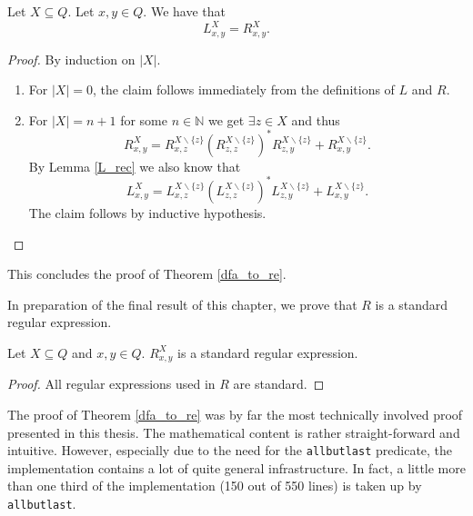 \begin{lemma}
    \label{L_R}
    Let $X \subseteq Q$. Let $x,y \in Q$. We have that 
    \begin{equation*}
        L^X_{x,y} = R^X_{x,y}.
    \end{equation*}
\end{lemma}
\begin{proof}
    By induction on $|X|$.
    \begin{enumerate}
        \item For $|X| = 0$, the claim follows immediately from the definitions of $L$ and $R$. 
        \item For $|X| = n+1$ for some $n \in \mathbb{N}$ we get $\exists z \in X$ and thus 
            \begin{equation*}
                R^X_{x,y} = R^{X\backslash\{z\}}_{x,z} (R^{X\backslash\{z\}}_{z,z})^* R^{X\backslash\{z\}}_{z,y} 
                + R^{X\backslash\{z\}}_{x,y}.
            \end{equation*}
            By Lemma \ref{L_rec} we also know that 
            \begin{equation*}
                L^X_{x,y} = L^{X\backslash\{z\}}_{x,z} (L^{X\backslash\{z\}}_{z,z})^* L^{X\backslash\{z\}}_{z,y}
                + L^{X\backslash\{z\}}_{x,y}.
            \end{equation*}
            The claim follows by inductive hypothesis.
    \end{enumerate}
\end{proof}


This concludes the proof of Theorem \ref{dfa_to_re}.


In preparation of the final result of this chapter, we prove that $R$ is a standard regular expression.
\begin{lemma}
    \label{R_standard}
        Let $X \subseteq Q$ and $x,y \in Q$. $R^X_{x,y}$ is a standard regular expression.
    \end{lemma}
\begin{proof}
    All regular expressions used in $R$ are standard.
\end{proof}


The proof of Theorem \ref{dfa_to_re} was by far the most technically involved proof presented in this thesis. 
The mathematical content is rather straight-forward and intuitive.
However, especially due to the need for the \lstinline{allbutlast} predicate,
the implementation contains a lot of quite general infrastructure.
In fact, a little more than one third of the implementation (150 out of 550 lines) is taken up by \lstinline{allbutlast}.


